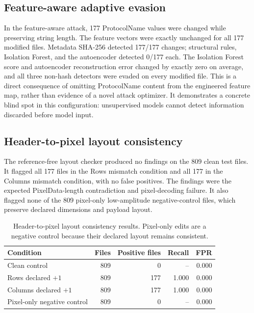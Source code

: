 \documentclass[journal]{IEEEtran}
\begin{document}
  \subsection{Feature-aware adaptive evasion}
  In the feature-aware attack, 177 ProtocolName values were changed while preserving string length. The feature vectors were exactly unchanged for all 177 modified files. Metadata SHA-256 detected 177/177 changes; structural rules, Isolation Forest, and the autoencoder detected 0/177 each. The Isolation Forest score and autoencoder reconstruction error changed by exactly zero on average, and all three non-hash detectors were evaded on every modified file. This is a direct consequence of omitting ProtocolName content from the engineered feature map, rather than evidence of a novel attack optimizer. It demonstrates a concrete blind spot in this configuration: unsupervised models cannot detect information discarded before model input.
  
  \subsection{Header-to-pixel layout consistency}
  The reference-free layout checker produced no findings on the 809 clean test files. It flagged all 177 files in the Rows mismatch condition and all 177 in the Columns mismatch condition, with no false positives. The findings were the expected PixelData-length contradiction and pixel-decoding failure. It also flagged none of the 809 pixel-only low-amplitude negative-control files, which preserve declared dimensions and payload layout.
  
  \begin{table}[t]
  \caption{Header-to-pixel layout consistency results. Pixel-only edits are a negative control because their declared layout remains consistent.}
  \label{tab:crosslayer}
  \centering\scriptsize
  \begin{tabular}{lrrrr}
  \toprule
  Condition & Files & Positive files & Recall & FPR \\
  \midrule
  Clean control & 809 & 0 & -- & 0.000 \\
  Rows declared $+1$ & 809 & 177 & 1.000 & 0.000 \\
  Columns declared $+1$ & 809 & 177 & 1.000 & 0.000 \\
  Pixel-only negative control & 809 & 0 & -- & 0.000 \\
  \bottomrule
  \end{tabular}
  \end{table}
  
\end{document}
